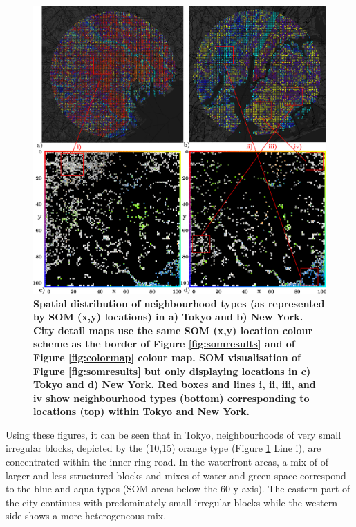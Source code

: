 \begin{figure}
\centering
\includegraphics[trim={0 0 0 0},clip,scale=0.23]{BlockTypologies_Figures5.png} 
\caption{\bf Spatial distribution of neighbourhood types (as represented by SOM (x,y) locations) in a) Tokyo and b) New York. City detail maps use the same SOM (x,y) location colour scheme as the border of Figure \ref{fig:somresults} and of Figure \ref{fig:colormap} colour map. SOM visualisation of Figure \ref{fig:somresults} but only displaying locations in c) Tokyo and d) New York. Red boxes and lines i, ii, iii, and iv show neighbourhood types (bottom) corresponding to locations (top) within Tokyo and New York.}
 \label{fig:citylocations}
\end{figure} 

Using these figures, it can be seen that in Tokyo, neighbourhoods of very small irregular blocks, depicted by the (10,15) orange type (Figure \ref{fig:citylocations} Line i), are concentrated within the inner ring road. In the waterfront areas, a mix of of larger and less structured blocks and mixes of water and green space correspond to the blue and aqua types (SOM areas below the 60 y-axis). The eastern part of the city continues with predominately small irregular blocks while the western side shows a more heterogeneous mix. 

